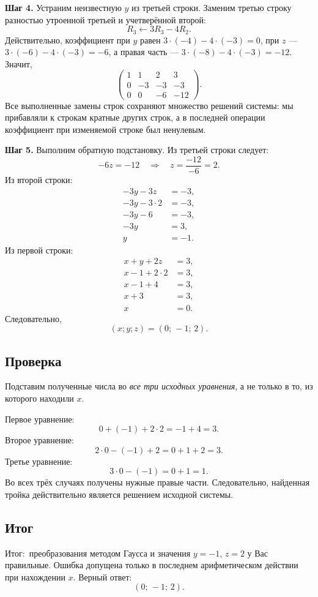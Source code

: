 \documentclass[12pt,a4paper]{article}
\newcommand{\result}{\textcolor{teal!60!black}{Итог:}}
\begin{document}
\textbf{Шаг 4.} Устраним неизвестную $y$ из третьей строки. Заменим третью строку разностью утроенной третьей и учетверённой второй:
\[
R_3\leftarrow 3R_3-4R_2.
\]
Действительно, коэффициент при $y$ равен $3\cdot(-4)-4\cdot(-3)=0$, при $z$ --- $3\cdot(-6)-4\cdot(-3)=-6$, а правая часть --- $3\cdot(-8)-4\cdot(-3)=-12$. Значит,
\[
\left(\begin{array}{rrr|r}
1&1&2&3\\ 0&-3&-3&-3\\ 0&0&-6&-12
\end{array}\right).
\]
Все выполненные замены строк сохраняют множество решений системы: мы прибавляли к строкам кратные других строк, а в последней операции коэффициент при изменяемой строке был ненулевым.

\textbf{Шаг 5.} Выполним обратную подстановку. Из третьей строки следует:
\[
-6z=-12\quad\Longrightarrow\quad z=\frac{-12}{-6}=2.
\]
Из второй строки:
\begin{align*}
-3y-3z&=-3,\\
-3y-3\cdot2&=-3,\\
-3y-6&=-3,\\
-3y&=3,\\
y&=-1.
\end{align*}
Из первой строки:
\begin{align*}
x+y+2z&=3,\\
x-1+2\cdot2&=3,\\
x-1+4&=3,\\
x+3&=3,\\
x&=0.
\end{align*}
Следовательно,
\[
\boxed{(x;y;z)=(0;\,-1;\,2)}.
\]

\subsection*{Проверка}
Подставим полученные числа во \emph{все три исходных уравнения}, а не только в то, из которого находили $x$.

Первое уравнение:
\[
0+(-1)+2\cdot2=-1+4=3.
\]
Второе уравнение:
\[
2\cdot0-(-1)+2=0+1+2=3.
\]
Третье уравнение:
\[
3\cdot0-(-1)=0+1=1.
\]
Во всех трёх случаях получены нужные правые части. Следовательно, найденная тройка действительно является решением исходной системы.

\subsection*{Итог}
\result\ преобразования методом Гаусса и значения $y=-1$, $z=2$ у Вас правильные. Ошибка допущена только в последнем арифметическом действии при нахождении $x$. Верный ответ:
\[
\boxed{(0;\,-1;\,2)}.
\]
\end{document}
